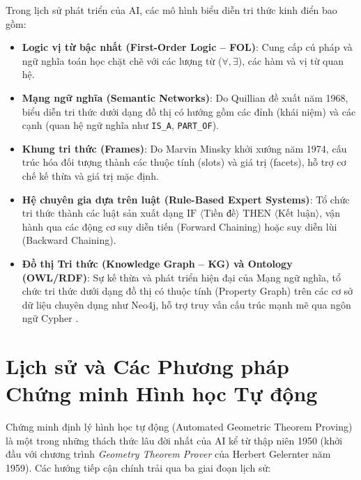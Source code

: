 Trong lịch sử phát triển của AI, các mô hình biểu diễn tri thức kinh điển bao gồm:
\begin{itemize}
    \item \textbf{Logic vị từ bậc nhất (First-Order Logic -- FOL)}: Cung cấp cú pháp và ngữ nghĩa toán học chặt chẽ với các lượng từ ($\forall, \exists$), các hàm và vị từ quan hệ.
    \item \textbf{Mạng ngữ nghĩa (Semantic Networks)}: Do Quillian đề xuất năm 1968, biểu diễn tri thức dưới dạng đồ thị có hướng gồm các đỉnh (khái niệm) và các cạnh (quan hệ ngữ nghĩa như \texttt{IS\_A}, \texttt{PART\_OF}).
    \item \textbf{Khung tri thức (Frames)}: Do Marvin Minsky khởi xướng năm 1974, cấu trúc hóa đối tượng thành các thuộc tính (slots) và giá trị (facets), hỗ trợ cơ chế kế thừa và giá trị mặc định.
    \item \textbf{Hệ chuyên gia dựa trên luật (Rule-Based Expert Systems)}: Tổ chức tri thức thành các luật sản xuất dạng $\text{IF } \langle \text{Tiền đề} \rangle \text{ THEN } \langle \text{Kết luận} \rangle$, vận hành qua các động cơ suy diễn tiến (Forward Chaining) hoặc suy diễn lùi (Backward Chaining).
    \item \textbf{Đồ thị Tri thức (Knowledge Graph -- KG) và Ontology (OWL/RDF)}: Sự kế thừa và phát triển hiện đại của Mạng ngữ nghĩa, tổ chức tri thức dưới dạng đồ thị có thuộc tính (Property Graph) trên các cơ sở dữ liệu chuyên dụng như Neo4j, hỗ trợ truy vấn cấu trúc mạnh mẽ qua ngôn ngữ Cypher \cite{auer2007dbpedia}.
\end{itemize}

\section{Lịch sử và Các Phương pháp Chứng minh Hình học Tự động}
Chứng minh định lý hình học tự động (Automated Geometric Theorem Proving) là một trong những thách thức lâu đời nhất của AI kể từ thập niên 1950 (khởi đầu với chương trình \textit{Geometry Theorem Prover} của Herbert Gelernter năm 1959). Các hướng tiếp cận chính trải qua ba giai đoạn lịch sử:

